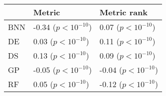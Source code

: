 \begin{tabular}{lll}
\toprule
{} &                Metric &           Metric rank \\
\midrule
BNN &  -0.34 ($p<10^{-10}$) &   0.07 ($p<10^{-10}$) \\
DE  &   0.03 ($p<10^{-10}$) &   0.11 ($p<10^{-10}$) \\
DS  &   0.13 ($p<10^{-10}$) &   0.09 ($p<10^{-10}$) \\
GP  &  -0.05 ($p<10^{-10}$) &  -0.04 ($p<10^{-10}$) \\
RF  &   0.05 ($p<10^{-10}$) &  -0.12 ($p<10^{-10}$) \\
\bottomrule
\end{tabular}
